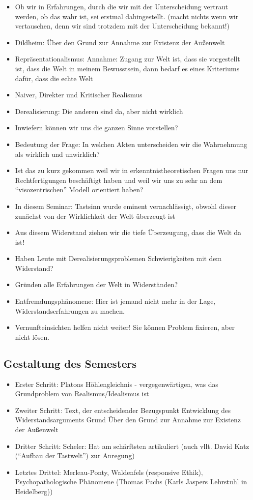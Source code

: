 \documentclass[emulatestandardclasses]{scrartcl}
\begin{document}
\begin{itemize}
  \item Ob wir in Erfahrungen, durch die wir mit der Unterscheidung vertraut werden, ob das wahr ist, sei erstmal dahingestellt. (macht nichts wenn wir vertauschen, denn wir sind trotzdem mit der Unterscheidung bekannt!)
  \item Dildheim: Über den Grund zur Annahme zur Existenz der Außenwelt 
  \item Repräsentationalismus: Annahme: Zugang zur Welt ist, dass sie vorgestellt ist, dass die Welt in meinem Bewusstsein, dann bedarf es eines Kriteriums dafür, dass die echte Welt 
  \item Naiver, Direkter und Kritischer Realismus
  \item Derealisierung: Die anderen sind da, aber nicht wirklich
  \item Inwiefern können wir uns die ganzen Sinne vorstellen?
  \item Bedeutung der Frage: In welchen Akten unterscheiden wir die Wahrnehmung als wirklich und unwirklich?
  \item Ist das zu kurz gekommen weil wir in erkenntnistheoretischen Fragen uns nur Rechtfertigungen beschäftigt haben und weil wir uns zu sehr an dem "`visozentrischen"' Modell orientiert haben?
  \item In diesem Seminar: Tastsinn wurde eminent vernachlässigt, obwohl dieser zunächst von der Wirklichkeit der Welt überzeugt ist
  \item Aus diesem Widerstand ziehen wir die tiefe Überzeugung, dass die Welt da ist!
  \item Haben Leute mit Derealisierungsproblemen Schwierigkeiten mit dem Widerstand?
  \item Gründen alle Erfahrungen der Welt in Widerständen?
  \item Entfremdungsphänomene: Hier ist jemand nicht mehr in der Lage, Widerstandserfahrungen zu machen.
  \item Vernunfteinsichten helfen nicht weiter! Sie können Problem fixieren, aber nicht lösen.
\end{itemize}

\subsection{Gestaltung des Semesters}

\begin{itemize}
  \item Erster Schritt: Platons Höhlengleichnis - vergegenwärtigen, was das Grundproblem von Realismus/Idealismus ist
  \item Zweiter Schritt: Text, der entscheidender Bezugspunkt Entwicklung des Widerstandsarguments Grund Über den Grund zur Annahme zur Existenz der Außenwelt
  \item Dritter Schritt: Scheler: Hat am schärftsten artikuliert (auch vllt. David Katz ("`Aufbau der Tastwelt"') zur Anregung)
  \item Letztes Drittel: Merleau-Ponty, Waldenfels (responsive Ethik), Psychopathologische Phänomene (Thomas Fuchs (Karls Jaspers Lehrstuhl in Heidelberg))	
\end{itemize}
\end{document}

